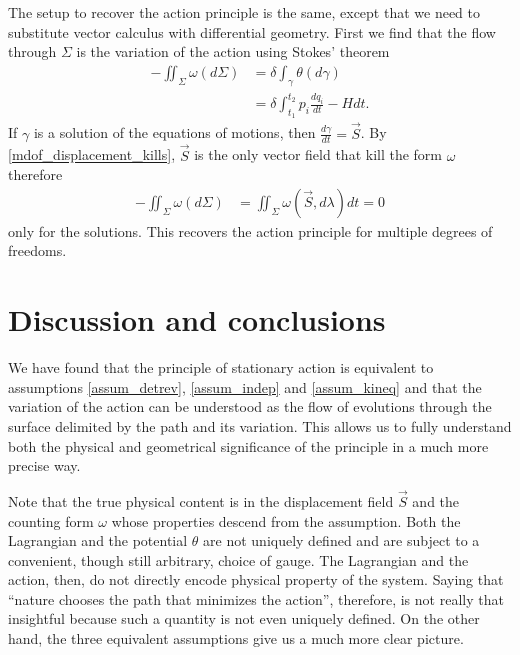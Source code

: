 \documentclass[10pt,twocolumn, nofootinbib]{revtex4-2}
\begin{document}
The setup to recover the action principle is the same, except that we need to substitute vector calculus with differential geometry. First we find that the flow through $\Sigma$ is the variation of the action using Stokes' theorem
\begin{equation}\label{mdof_action}
	\begin{aligned}
		- \iint_{\Sigma} \omega(d\Sigma) &= \delta \int_{\gamma} \theta(d\gamma) \\
		&= \delta \int^{t_2}_{t_1} p_i \frac{dq_i}{dt} - H dt .
	\end{aligned}
\end{equation}
If $\gamma$ is a solution of the equations of motions, then $\frac{d\gamma}{dt} = \vec{S}$. By \ref{mdof_displacement_kills}, $\vec{S}$ is the only vector field that kill the form $\omega$ therefore
\begin{equation}\label{mdof_stationary_action}
	\begin{aligned}
		- \iint_{\Sigma} \omega(d\Sigma) &= \iint_{\Sigma} \omega(\vec{S}, d\lambda) dt = 0
	\end{aligned}
\end{equation}
only for the solutions. This recovers the action principle for multiple degrees of freedoms.

\section{Discussion and conclusions}

We have found that the principle of stationary action is equivalent to assumptions \ref{assum_detrev}, \ref{assum_indep} and \ref{assum_kineq} and that the variation of the action can be understood as the flow of evolutions through the surface delimited by the path and its variation. This allows us to fully understand both the physical and geometrical significance of the principle in a much more precise way.

Note that the true physical content is in the displacement field $\vec{S}$ and the counting form $\omega$ whose properties descend from the assumption. Both the Lagrangian and the potential $\theta$ are not uniquely defined and are subject to a convenient, though still arbitrary, choice of gauge. The Lagrangian and the action, then, do not directly encode physical property of the system. Saying that ``nature chooses the path that minimizes the action'', therefore, is not really that insightful because such a quantity is not even uniquely defined. On the other hand, the three equivalent assumptions give us a much more clear picture.
\end{document}
